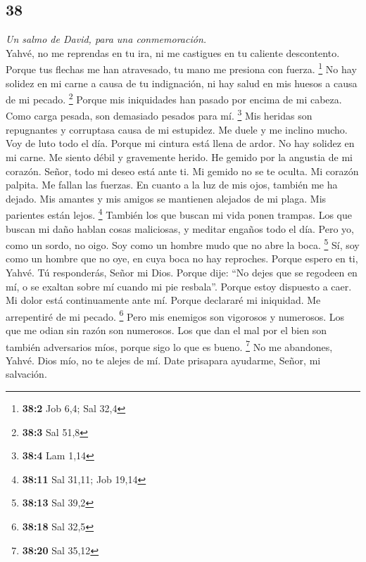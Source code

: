 \begin{paracol}{2}
\hypertarget{section-74}{%
\section{38}\label{section-74}}

\emph{Un salmo de David, para una conmemoración.}\\
 Yahvé, no me reprendas en tu ira, ni me castigues en tu
caliente descontento.  Porque tus flechas me han
atravesado, tu mano me presiona con fuerza. \footnote{\textbf{38:2} Job
  6,4; Sal 32,4}  No hay solidez en mi carne a causa de tu
indignación, ni hay salud en mis huesos a causa de mi pecado.
\footnote{\textbf{38:3} Sal 51,8}  Porque mis iniquidades
han pasado por encima de mi cabeza. Como carga pesada, son demasiado
pesados para mí. \footnote{\textbf{38:4} Lam 1,14}  Mis
heridas son repugnantes y corruptasa causa de mi estupidez.
 Me duele y me inclino mucho. Voy de luto todo el día.
 Porque mi cintura está llena de ardor. No hay solidez en
mi carne.  Me siento débil y gravemente herido. He gemido
por la angustia de mi corazón.  Señor, todo mi deseo está
ante ti. Mi gemido no se te oculta.  Mi corazón palpita.
Me fallan las fuerzas. En cuanto a la luz de mis ojos, también me ha
dejado.  Mis amantes y mis amigos se mantienen alejados
de mi plaga. Mis parientes están lejos. \footnote{\textbf{38:11} Sal
  31,11; Job 19,14}  También los que buscan mi vida ponen
trampas. Los que buscan mi daño hablan cosas maliciosas, y meditar
engaños todo el día.  Pero yo, como un sordo, no oigo.
Soy como un hombre mudo que no abre la boca. \footnote{\textbf{38:13}
  Sal 39,2}  Sí, soy como un hombre que no oye, en cuya
boca no hay reproches.  Porque espero en ti, Yahvé. Tú
responderás, Señor mi Dios.  Porque dije: ``No dejes que
se regodeen en mí, o se exaltan sobre mí cuando mi pie resbala''.
 Porque estoy dispuesto a caer. Mi dolor está
continuamente ante mí.  Porque declararé mi iniquidad. Me
arrepentiré de mi pecado. \footnote{\textbf{38:18} Sal 32,5}
 Pero mis enemigos son vigorosos y numerosos. Los que me
odian sin razón son numerosos.  Los que dan el mal por el
bien son también adversarios míos, porque sigo lo que es bueno.
\footnote{\textbf{38:20} Sal 35,12}  No me abandones,
Yahvé. Dios mío, no te alejes de mí.  Date prisapara
ayudarme, Señor, mi salvación.


\end{paracol}
